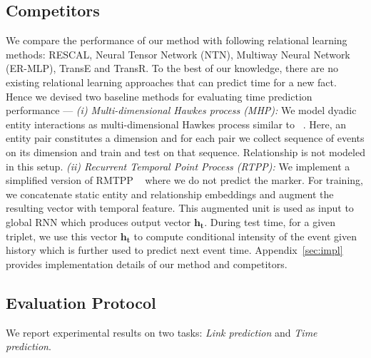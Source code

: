 \documentclass{article}
\begin{document}
\vspace{-0.2cm}
\subsection{Competitors}
We compare the performance of our method with following relational learning methods: 
RESCAL, Neural Tensor Network (NTN), Multiway Neural Network (ER-MLP), TransE and TransR. To the best of our knowledge, there are no existing relational learning approaches that can predict time for a new fact. Hence we devised two baseline methods for evaluating time prediction performance --- \emph{(i) Multi-dimensional Hawkes process (MHP):} We model dyadic entity interactions as multi-dimensional Hawkes process similar to ~\citep{DuWanHeetal15}. Here, an entity pair constitutes a dimension and for each pair we collect sequence of events on its dimension and train and test on that sequence. Relationship is not modeled in this setup. 
\emph{(ii) Recurrent Temporal Point Process (RTPP):} We implement a simplified version of RMTPP ~\citep{DuDaiTriUpaGomSon16} where we do not predict the marker. For training, we concatenate static entity and relationship embeddings and augment the resulting vector with temporal feature. This augmented unit is used as input to global RNN which produces output vector $\mathbf{h_t}$. During test time, for a given triplet, we use this vector $\mathbf{h_t}$ to compute conditional intensity of the event given history which is further used to predict next event time. Appendix~\ref{sec:impl} provides implementation details of our method and competitors.

\vspace{-0.2cm}

\subsection{Evaluation Protocol}
We report experimental results on two tasks: \emph{Link  prediction} and \emph{Time prediction}.
\end{document}

